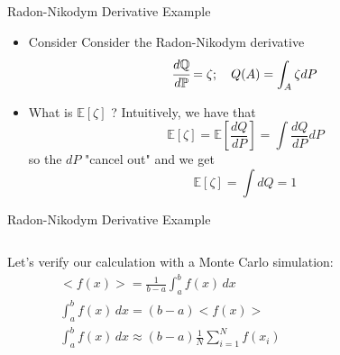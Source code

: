 \documentclass{beamer}
\begin{document}
\begin{frame}[fragile]{Radon-Nikodym Derivative Example}
\begin{itemize}
    \item Consider Consider the Radon-Nikodym derivative
\begin{equation*}
\cfrac{d\mathbb{Q}}{d\mathbb{P}}=\zeta;\quad Q(A) = \int_A \zeta dP
\end{equation*}
    \item What is $\mathbb{E}[\zeta]$ ? Intuitively, we have that
\begin{equation*}
\mathbb{E}[\zeta]=\mathbb{E}\left[\frac{dQ}{dP}\right]=\int \frac{dQ}{dP} dP
\end{equation*}
so the $dP$ "cancel out" and we get
\begin{equation*}
\mathbb{E}[\zeta]=\int dQ = 1
\end{equation*}
\end{itemize}
\end{frame}

\begin{frame}[fragile]{Radon-Nikodym Derivative Example}
\begin{columns}
    Let's verify our calculation with a Monte Carlo simulation:
    \begin{equation*}
        \begin{gathered}
        <f(x)> = \frac{1}{b-a}  \int_{a}^{b} f(x) \,dx\\
        \int_{a}^{b} f(x) \,dx = (b-a) <f(x)>\\
        \int_{a}^{b} f(x) \,dx \approx (b-a) \frac{1}{N} \sum_{i=1}^{N} f(x_i)
        \end{gathered}
    \end{equation*}
\end{columns}
\end{frame}
\end{document}
